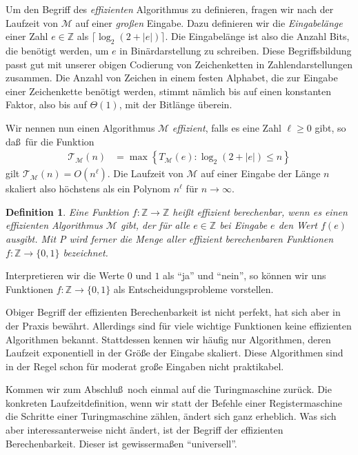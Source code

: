 \documentclass[10pt,reqno]{amsart}
\numberwithin{equation}{section}
\newcommand\cM{\mathcal M}
\newcommand\cT{\mathcal T}
\newcommand\ZZ{\mathbb Z}
\newtheorem{definition}{Definition}[section]
\newcommand\cbc[1]{\left\{{#1}\right\}}
\begin{document}
Um den Begriff des {\em effizienten} Algorithmus zu definieren, fragen wir nach der Laufzeit von $\cM$ auf einer {\em gro\ss en} Eingabe.
Dazu definieren wir die {\em Eingabel\"ange} einer Zahl $e\in\ZZ$ als $\lceil\log_2(2+|e|)\rceil$.
Die Eingabel\"ange ist also die Anzahl Bits, die ben\"otigt werden, um $e$ in Bin\"ardarstellung zu schreiben.
Diese Begriffsbildung passt gut mit unserer obigen Codierung von Zeichenketten in Zahlendarstellungen zusammen.
Die Anzahl von Zeichen in einem festen Alphabet, die zur Eingabe einer Zeichenkette ben\"otigt werden, stimmt n\"amlich bis auf einen konstanten Faktor, also bis auf $\Theta(1)$, mit der Bitl\"ange \"uberein.

Wir nennen nun einen Algorithmus $\cM$ {\em effizient}, falls es eine Zahl $\ell\geq0$ gibt, so da\ss\ f\"ur die Funktion
\begin{align*}
	\cT_{\cM}(n)&=\max\cbc{T_\cM(e):\log_2(2+|e|)\leq n}
\end{align*}
gilt $\cT_{\cM}(n)=O(n^\ell)$.
Die Laufzeit von $\cM$ auf einer Eingabe der L\"ange $n$ skaliert also h\"ochstens als ein Polynom $n^\ell$ f\"ur $n\to\infty$.

\begin{definition}\label{def_P}
	Eine Funktion $f:\ZZ\to\ZZ$ hei\ss t {\em effizient berechenbar}, wenn es einen effizienten Algorithmus $\cM$ gibt, der f\"ur alle $e\in\ZZ$ bei Eingabe $e$ den Wert $f(e)$ ausgibt.
	Mit P wird ferner die Menge aller effizient berechenbaren Funktionen $f:\ZZ\to\{0,1\}$ bezeichnet.
\end{definition}

Interpretieren wir die Werte $0$ und $1$ als ``ja'' und ``nein'', so k\"onnen wir uns Funktionen $f:\ZZ\to\{0,1\}$ als Entscheidungsprobleme vorstellen.

Obiger Begriff der effizienten Berechenbarkeit ist nicht perfekt, hat sich aber in der Praxis bew\"ahrt.
Allerdings sind f\"ur viele wichtige Funktionen keine effizienten Algorithmen bekannt.
Stattdessen kennen wir h\"aufig nur Algorithmen, deren Laufzeit exponentiell in der Gr\"o\ss e der Eingabe skaliert. 
Diese Algorithmen sind in der Regel schon f\"ur moderat gro\ss e Eingaben nicht praktikabel.

Kommen wir zum Abschlu\ss\ noch einmal auf die Turingmaschine zur\"uck.
Die konkreten Laufzeitdefinition, wenn wir statt der Befehle einer Registermaschine die Schritte einer Turingmaschine z\"ahlen, \"andert sich ganz erheblich.
Was sich aber interessanterweise nicht \"andert, ist der Begriff der effizienten Berechenbarkeit.
Dieser ist gewisserma\ss en ``universell''.
\end{document}
